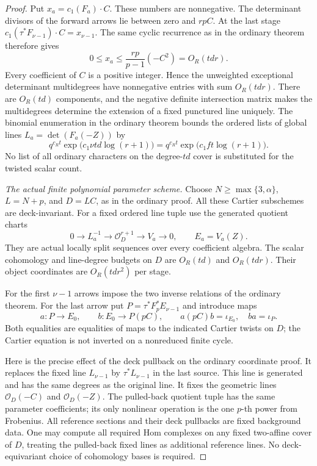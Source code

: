 \begin{proof}
Put $x_a=c_1(F_a)\cdot C$. These numbers are nonnegative.
The determinant divisors of the forward arrows lie
between zero and $rpC$. At the last stage
$c_1(\tau^*F_{\nu-1})\cdot C=x_{\nu-1}$.
The same cyclic recurrence as in the ordinary theorem
therefore gives
\[
     0\le x_a\le\frac{rp}{p-1}(-C^2)=O_R(td r).
                                                               \tag{D.SH.5}
\]
Every coefficient of $C$ is a positive integer. Hence
the unweighted exceptional determinant multidegrees have
nonnegative entries with sum $O_R(td r)$.
There are $O_R(td)$ components, and the negative definite
intersection matrix makes the multidegrees determine
the extension of a fixed punctured line uniquely.
The binomial enumeration in the ordinary theorem bounds
the ordered lists of global lines
$L_a=\det(F_a(-Z))$ by
\[
 q^{c_Rt}\exp\bigl(c_1\nu td\log(r+1)\bigr)
       =q^{c_Rt}\exp\bigl(c_1ft\log(r+1)\bigr).         \tag{D.SH.6}
\]
No list of all ordinary characters on the degree-$td$
cover is substituted for the twisted scalar count.

\emph{The actual finite polynomial parameter scheme.}
Choose $N\ge\max\{3,\alpha\}$, $L=N+p$, and $D=LC$,
as in the ordinary proof. All these Cartier subschemes
are deck-invariant. For a fixed ordered line tuple use
the generated quotient charts
\[
 0\longrightarrow L_a^{-1}\longrightarrow
 \mathcal O_D^{r+1}\longrightarrow V_a\longrightarrow0,
             \qquad E_a=V_a(Z).                        \tag{D.SH.7}
\]
They are actual locally split sequences over every
coefficient algebra. The scalar cohomology and line-degree
budgets on $D$ are $O_R(td)$ and $O_R(td r)$.
Their object coordinates are $O_R(td r^2)$ per stage.

For the first $\nu-1$ arrows impose the two inverse
relations of the ordinary theorem. For the last arrow
put $P=\tau^*F_p^*E_{\nu-1}$ and introduce maps
\[
 a:P\longrightarrow E_0,\qquad
 b:E_0\longrightarrow P(pC),\qquad
 a(pC)b=\iota_{E_0},\quad ba=\iota_P.                 \tag{D.SH.8}
\]
Both equalities are equalities of maps to the indicated
Cartier twists on $D$; the Cartier equation is not inverted
on a nonreduced finite cycle.

Here is the precise effect of the deck pullback on the
ordinary coordinate proof. It replaces the fixed line
$L_{\nu-1}$ by $\tau^*L_{\nu-1}$ in the last source.
This line is generated and has the same degrees as the
original line. It fixes the geometric lines
$\mathcal O_D(-C)$ and $\mathcal O_D(-Z)$.
The pulled-back quotient tuple has the same parameter
coefficients; its only nonlinear operation is the one
$p$-th power from Frobenius. All reference sections and
their deck pullbacks are fixed background data.
One may compute all required Hom complexes on any fixed
two-affine cover of $D$, treating the pulled-back fixed
lines as additional reference lines. No deck-equivariant
choice of cohomology bases is required.


\end{proof}
